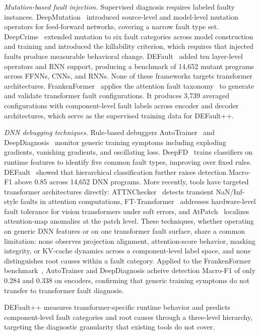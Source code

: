 \textit{Mutation-based fault injection.} Supervised diagnosis requires labeled faulty instances. DeepMutation~\cite{deepmutation} introduced source-level and model-level mutation operators for feed-forward networks, covering a narrow fault type set. DeepCrime~\cite{deepcrime} extended mutation to six fault categories across model construction and training and introduced the killability criterion, which requires that injected faults produce measurable behavioral change. DEFault~\cite{default} added ten layer-level operators and RNN support, producing a benchmark of 14{,}652 mutant programs across FFNNs, CNNs, and RNNs. None of these frameworks targets transformer architectures. FrankenFormer~\cite{frankenformer} applies the attention fault taxonomy~\cite{attention_taxonomy} to generate and validate transformer fault configurations. It produces 3{,}739 averaged configurations with component-level fault labels across encoder and decoder architectures, which serve as the supervised training data for DEFault++.

\textit{DNN debugging techniques.} Rule-based debuggers AutoTrainer~\cite{autotrainer} and DeepDiagnosis~\cite{deepdiagnosis} monitor generic training symptoms including exploding gradients, vanishing gradients, and oscillating loss. DeepFD~\cite{deepfd} trains classifiers on runtime features to identify five common fault types, improving over fixed rules. DEFault~\cite{default} showed that hierarchical classification further raises detection Macro-F1 above 0.85 across 14{,}652 DNN programs. More recently, tools have targeted transformer architectures directly: ATTNChecker~\cite{liang2025attnchecker} detects transient NaN/Inf-style faults in attention computations, FT-Transformer~\cite{fttransformer} addresses hardware-level fault tolerance for vision transformers under soft errors, and AtPatch~\cite{atpatch2026} localizes attention-map anomalies at the patch level. These techniques, whether operating on generic DNN features or on one transformer fault surface, share a common limitation: none observes projection alignment, attention-score behavior, masking integrity, or KV-cache dynamics across a component-level label space, and none distinguishes root causes within a fault category. Applied to the FrankenFormer benchmark~\cite{frankenformer}, AutoTrainer and DeepDiagnosis acheive detection Macro-F1 of only 0.284 and 0.338 on encoders, confirming that generic training symptoms do not transfer to transformer fault diagnosis.

DEFault++ measures transformer-specific runtime behavior and predicts component-level fault categories and root causes through a three-level hierarchy, targeting the diagnostic granularity that existing tools do not cover.

